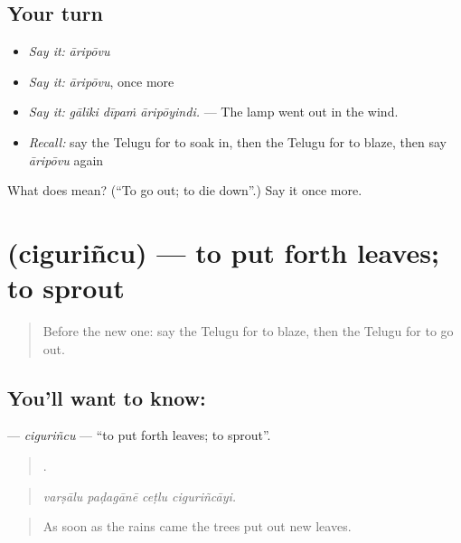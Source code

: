 \subsection*{Your turn}
\begin{itemize}
\raggedright
  \item \emph{Say it:} \emph{āripōvu}
  \item \emph{Say it:} \emph{āripōvu}, once more
  \item \emph{Say it:} \emph{gāliki dīpaṁ āripōyindi.} — The lamp went out in the wind.
  \item \emph{Recall:} say the Telugu for to soak in, then the Telugu for to blaze, then say \emph{āripōvu} again
\end{itemize}

\begin{tcolorbox}[breakable,colback=teal!4,colframe=teal!35!black,title={Before you move on}]
What does  mean? (\textquotedblleft{}To go out; to die down\textquotedblright{}.) Say it once more.
\end{tcolorbox}
\section[\texorpdfstring{\te{చిగురించు} (ciguriñcu)}{చిగురించు (ciguriñcu)}]{ (ciguriñcu) — to put forth leaves; to sprout}

\label{lesson:TE-C483-cigurincu}



\begin{quote}
Before the new one: say the Telugu for to blaze, then the Telugu for to go out.
\end{quote}

\subsection*{You'll want to know: }
\textbf{} — \emph{ciguriñcu} — \textquotedblleft{}to put forth leaves; to sprout\textquotedblright{}.

\begin{quote}
   .
\end{quote}

\begin{quote}
\emph{varṣālu paḍagānē ceṭlu ciguriñcāyi.}
\end{quote}

\begin{quote}
As soon as the rains came the trees put out new leaves.
\end{quote}

